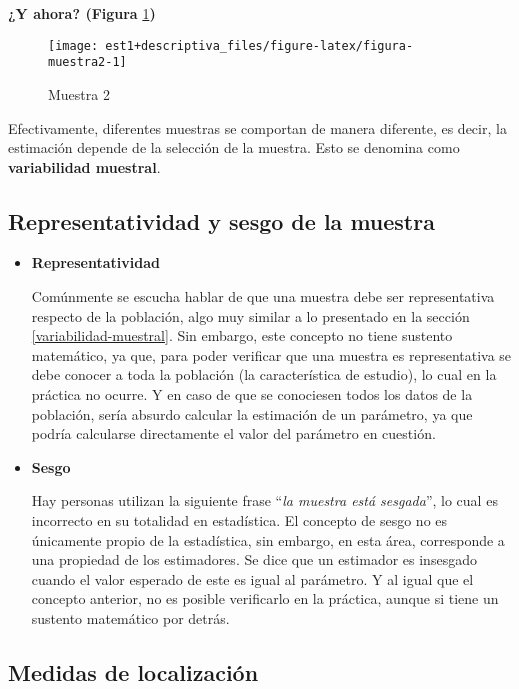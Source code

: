 \documentclass[
]{book}
\theoremstyle{definition}
\theoremstyle{definition}
\theoremstyle{definition}
\theoremstyle{definition}
\theoremstyle{remark}
\begin{document}
\textbf{¿Y ahora? (Figura} \ref{fig:figura-muestra2}\textbf{)}

\begin{figure}

{\centering \texttt{[image: est1+descriptiva\_files/figure-latex/figura-muestra2-1]} 

}

\caption{Muestra 2}\label{fig:figura-muestra2}
\end{figure}

Efectivamente, diferentes muestras se comportan de manera diferente, es decir, la estimación depende de la selección de la muestra. Esto se denomina como \textbf{variabilidad muestral}.

\hypertarget{representatividad-y-sesgo-de-la-muestra}{%
\subsection{Representatividad y sesgo de la muestra}\label{representatividad-y-sesgo-de-la-muestra}}

\begin{itemize}
\item
  \textbf{Representatividad}

  Comúnmente se escucha hablar de que una muestra debe ser representativa respecto de la población, algo muy similar a lo presentado en la sección \ref{variabilidad-muestral}. Sin embargo, este concepto no tiene sustento matemático, ya que, para poder verificar que una muestra es representativa se debe conocer a toda la población (la característica de estudio), lo cual en la práctica no ocurre. Y en caso de que se conociesen todos los datos de la población, sería absurdo calcular la estimación de un parámetro, ya que podría calcularse directamente el valor del parámetro en cuestión.
\item
  \textbf{Sesgo}

  Hay personas utilizan la siguiente frase ``\emph{la muestra está sesgada}'', lo cual es incorrecto en su totalidad en estadística. El concepto de sesgo no es únicamente propio de la estadística, sin embargo, en esta área, corresponde a una propiedad de los estimadores. Se dice que un estimador es insesgado cuando el valor esperado de este es igual al parámetro. Y al igual que el concepto anterior, no es posible verificarlo en la práctica, aunque si tiene un sustento matemático por detrás.
\end{itemize}

\hypertarget{medidas-de-localizaciuxf3n}{%
\subsection{Medidas de localización}\label{medidas-de-localizaciuxf3n}}
\end{document}
